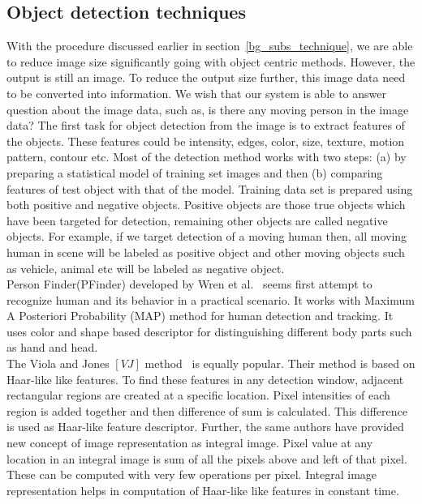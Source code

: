 \subsection{Object detection techniques}
\indent With the procedure discussed earlier in
section~\ref{bg_subs_technique}, we are able to reduce image size
significantly going with object centric methods. However, the output is
still an image. To reduce the output size further, this image data need
to be converted into information. We wish that our system is able to
answer question about the image data, such as, is there any moving
person in the image data? The first task for object detection from the
image is to extract features of the objects. These features could be
intensity, edges, color, size, texture, motion pattern, contour etc.
Most of the detection method works with two steps: (a) by preparing a
statistical model of training set images and then (b) comparing features
of test object with that of the model. Training data set is prepared
using both positive and negative objects. Positive objects are those
true objects which have been targeted for detection, remaining other
objects are called negative objects. For example, if we target detection
of a moving human then, all moving human in scene will be labeled as
positive object and other moving objects such as vehicle, animal etc
will be labeled as negative object.\\
\indent Person Finder(PFinder) developed by Wren et al.~\cite{12} seems
first attempt to recognize human and its behavior in a practical
scenario. It works with Maximum A Posteriori Probability (MAP) method
for human detection and tracking. It uses color and shape based
descriptor for distinguishing different body parts such as hand and
head.\\
\indent The Viola and Jones $[VJ]$ method~\cite{16, 17} is equally
popular. Their method is based on Haar-like like features. To find these
features in any detection window, adjacent rectangular regions are
created at a specific location. Pixel intensities of each region is
added together and then difference of sum is calculated. This difference
is used as Haar-like feature descriptor. Further, the same authors have
provided new concept of image representation as integral image. Pixel
value at any location in an integral image is sum of all the pixels
above and left of that pixel. These can be computed with very few
operations per pixel. Integral image representation helps in
computation of Haar-like like features in constant time.\\

